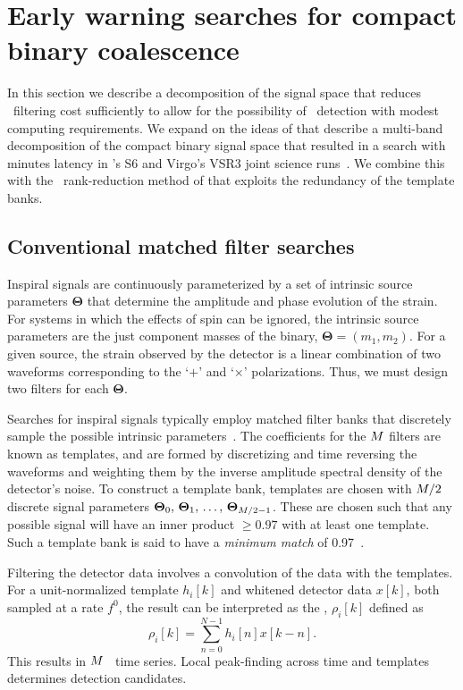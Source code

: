 \section{Early warning searches for compact binary coalescence}
\label{sec:method}

In this section we describe a decomposition of the \CBC{} signal space that
reduces \TD\ filtering cost sufficiently to allow for the
possibility of \earlywarning\ detection with modest computing requirements.  We
expand on the ideas of \citet{Marion2004, Buskulic2010} that describe a
multi-band decomposition of the compact binary signal space that resulted in
a search with minutes latency in \LIGO{}'s S6 and Virgo's VSR3 joint science
runs~\citep{HugheyGWPAW2011}.  We combine this with the \SVD\ rank-reduction
method of \citet{Cannon:2010p10398} that exploits the redundancy of
the template banks.

\subsection{Conventional \CBC{} matched filter searches}

Inspiral signals are continuously parameterized by a set of intrinsic source
parameters $\mathbf\Theta$ that determine the amplitude and phase evolution of the
\GW{} strain. For systems in which the effects of spin can be ignored, the intrinsic
source parameters are the just component masses of the binary,
 $\mathbf\Theta = (m_1, m_2)$. For a given source, the strain observed by the
 detector is a linear combination of two waveforms corresponding to the
`$+$' and `$\times$' \GW{} polarizations.  Thus, we must design two filters
for each $\mathbf\Theta$.

Searches for inspiral signals typically employ matched filter
banks that discretely sample the possible intrinsic parameters~\citep{findchirppaper}.
The coefficients for the $M$ filters are known as templates, 
and are formed by discretizing and time reversing the
waveforms and weighting them by the inverse amplitude spectral density of the
detector's noise.
To construct a template bank, templates are chosen with
$M/2$ discrete signal parameters $\mathbf\Theta_0,\, \mathbf\Theta_1,\, \dots,\,
\mathbf\Theta_{M/2-1}$. These are chosen such that any possible signal
will have an inner product $\geqslant 0.97$ with at least one template.
Such a template bank is said to have a {\em minimum match} of 0.97~\citep{Owen:1998dk}.

Filtering the detector data involves a convolution of the data with the
templates.  For a unit-normalized template $h_i[k]$ and whitened detector data
$x[k]$, both sampled at a rate $f^0$, the result can be interpreted as the
\SNR{}, $\rho_i[k]$ defined as
%
%
\begin{equation}
	\label{eq:SNRTD}
	\rho_i [k] = \sum_{n=0}^{N-1} h_{i}[n] x [k-n].
\end{equation}
This results in $M$ \SNR\ time series. Local peak-finding across time and
templates determines detection candidates.

